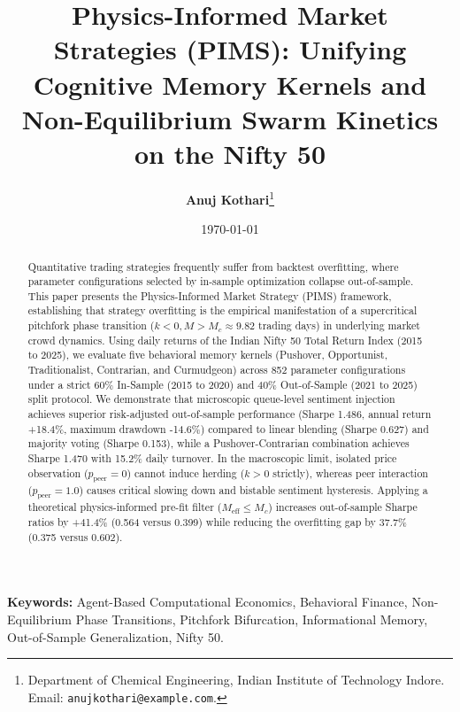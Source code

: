 \documentclass[11pt,a4paper]{article}
\title{\LARGE \textbf{Physics-Informed Market Strategies (PIMS): Unifying Cognitive Memory Kernels and Non-Equilibrium Swarm Kinetics on the Nifty 50}}
\author{
    \textbf{Anuj Kothari}\thanks{Department of Chemical Engineering, Indian Institute of Technology Indore. Email: \texttt{anujkothari@example.com}.}
}
\date{\today}
\begin{document}
\maketitle

\begin{abstract}
Quantitative trading strategies frequently suffer from backtest overfitting, where parameter configurations selected by in-sample optimization collapse out-of-sample. This paper presents the Physics-Informed Market Strategy (PIMS) framework, establishing that strategy overfitting is the empirical manifestation of a supercritical pitchfork phase transition ($k < 0, M > M_c \approx 9.82$ trading days) in underlying market crowd dynamics. Using daily returns of the Indian Nifty 50 Total Return Index (2015 to 2025), we evaluate five behavioral memory kernels (Pushover, Opportunist, Traditionalist, Contrarian, and Curmudgeon) across 852 parameter configurations under a strict 60\% In-Sample (2015 to 2020) and 40\% Out-of-Sample (2021 to 2025) split protocol. We demonstrate that microscopic queue-level sentiment injection achieves superior risk-adjusted out-of-sample performance (Sharpe 1.486, annual return +18.4\%, maximum drawdown -14.6\%) compared to linear blending (Sharpe 0.627) and majority voting (Sharpe 0.153), while a Pushover-Contrarian combination achieves Sharpe 1.470 with 15.2\% daily turnover. In the macroscopic limit, isolated price observation ($p_{\text{peer}}=0$) cannot induce herding ($k > 0$ strictly), whereas peer interaction ($p_{\text{peer}}=1.0$) causes critical slowing down and bistable sentiment hysteresis. Applying a theoretical physics-informed pre-fit filter ($M_{\text{eff}} \le M_c$) increases out-of-sample Sharpe ratios by +41.4\% (0.564 versus 0.399) while reducing the overfitting gap by 37.7\% (0.375 versus 0.602).
\end{abstract}

\vspace{0.5cm}
\noindent \textbf{Keywords:} Agent-Based Computational Economics, Behavioral Finance, Non-Equilibrium Phase Transitions, Pitchfork Bifurcation, Informational Memory, Out-of-Sample Generalization, Nifty 50.

\newpage












\newpage


\end{document}
